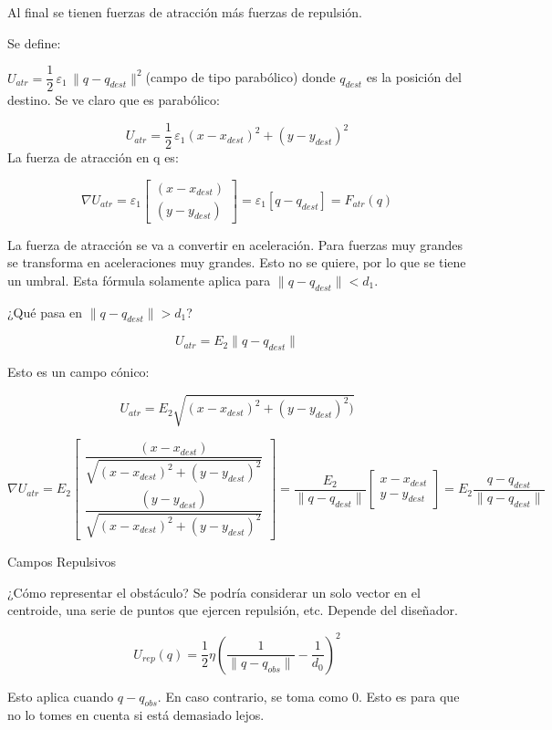 Al final se tienen fuerzas de atracción más fuerzas de repulsión.

Se define:

$U_{atr} = \dfrac{1}{2} \, \varepsilon_1 \,  \|q-q_{dest}\|^2 $(campo de tipo parabólico) donde $q_{dest}$  es la posición del destino. 
Se ve claro que es parabólico:

$$
U_{atr}=\frac{1}{2} \, \varepsilon_1(x-x_{dest})^2 + (y-y_{dest})^2
$$
La fuerza de atracción en q es:

$$
\nabla U_{atr}= \varepsilon_1 \begin{bmatrix}(x-x_{dest}) \\ (y-y_{dest}) \end{bmatrix} = \varepsilon_1[q-q_{dest}] = F_{atr}(q)
$$



La fuerza de atracción se va a convertir en aceleración. Para fuerzas muy grandes se transforma en aceleraciones muy grandes. 
Esto no se quiere, por lo que se tiene un umbral. Esta fórmula solamente aplica para $\|q-q_{dest}\| < d_1$.

¿Qué pasa en $\|q-q_{dest}\|>d_1$?

$$
U_{atr}=E_2\|q-q_{dest}\|
$$

Esto es un campo cónico:

$$
U_{atr}=E_2\sqrt{(x-x_{dest})^2 + (y-y_{dest})^2)}
$$

$$
\nabla U_{atr} = E_2 \begin{bmatrix} \dfrac{(x-x_{dest})}{\sqrt{(x-x_{dest})^2+(y-y_{dest})^2}} \\ 
\dfrac{(y-y_{dest})}{\sqrt{(x-x_{dest})^2+(y-y_{dest})^2}}
\end{bmatrix} = \dfrac{E_2}{\rVert q-q_{dest}\lVert}
\begin{bmatrix}
x-x_{dest} \\
y-y_{dest}
\end{bmatrix} = E_2 \dfrac{q-q_{dest}}{\lVert q-q_{dest}\rVert}
$$

Campos Repulsivos

¿Cómo representar el obstáculo? Se podría considerar un solo vector en el centroide, una serie de puntos que ejercen repulsión, etc. Depende del diseñador.

$$U_{rep}(q)=\frac{1}{2}\eta \left( \dfrac{1}{\lVert q-q_{obs}\rVert} - \dfrac{1}{d_0} \right) ^2 $$

Esto aplica cuando $q-q_{obs}$. En caso contrario, se toma como 0. Esto es para que no lo tomes en cuenta si está demasiado lejos.

